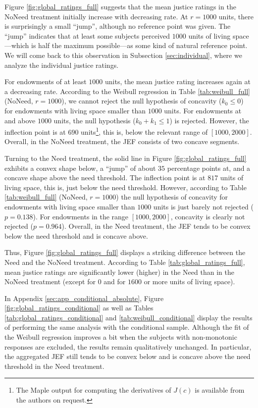 \documentclass[12pt]{scrartcl}
\begin{document}
Figure \ref{fig:global_ratings_full} suggests that the mean justice ratings in the NoNeed treatment initially increase with decreasing rate.
At $r=1000$ units, there is surprisingly a small ``jump'', although no reference point was given.
The ``jump'' indicates that at least some subjects perceived $1000$ units of living space---which is half the maximum possible---as some kind of natural reference point.
We will come back to this observation in Subsection \ref{sec:individual}, where we analyze the individual justice ratings.

For endowments of at least $1000$ units, the mean justice rating increases again at a decreasing rate.
According to the Weibull regression in Table \ref{tab:weibull_full} (NoNeed, $r=1000$), we cannot reject the null hypothesis of concavity ($k_0\le 0$) for endowments with living space smaller than $1000$ units.
For endowments at and above $1000$ units, the null hypothesis ($k_0+k_1\le 1$) is rejected.
However, the inflection point is at $690$ units\footnote{The Maple output for computing the derivatives of $J(c)$ is available from the authors on request.}, this is, below the relevant range of $[1000,2000]$.
Overall, in the NoNeed treatment, the JEF consists of two concave segments.

Turning to the Need treatment, the solid line in Figure \ref{fig:global_ratings_full} exhibits a convex shape below, a ``jump'' of about $35$ percentage points at, and a concave shape above the need threshold.
The inflection point is at $817$ units of living space, this is, just below the need threshold.
However, according to Table \ref{tab:weibull_full} (NoNeed, $r=1000$) the null hypothesis of concavity for endowments with living space smaller than $1000$ units is just barely not rejected ($p=0.138$).
For endowments in the range $[1000,2000]$, concavity is clearly not rejected ($p=0.964$).
Overall, in the Need treatment, the JEF tends to be convex below the need threshold and is concave above.

Thus, Figure \ref{fig:global_ratings_full} displays a striking difference between the Need and the NoNeed treatment.
According to Table \ref{tab:global_ratings_full}, mean justice ratings are significantly lower (higher) in the Need than in the NoNeed treatment (except for $0$ and for $1600$ or more units of living space).

In Appendix \ref{sec:app_conditional_absolute}, Figure \ref{fig:global_ratings_conditional} as well as Tables \ref{tab:global_ratings_conditional} and \ref{tab:weibull_conditional} display the results of performing the same analysis with the conditional sample.
Although the fit of the Weibull regression improves a bit when the subjects with non-monotonic responses are excluded, the results remain qualitatively unchanged.
In particular, the aggregated JEF still tends to be convex below and is concave above the need threshold in the Need treatment.
\end{document}

